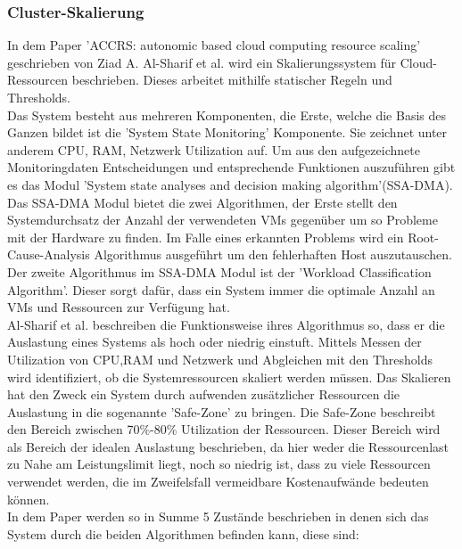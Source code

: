 \documentclass[a4paper,12pt]{scrartcl}
\begin{document}
\subsubsection{Cluster-Skalierung}

In dem Paper 'ACCRS: autonomic based cloud computing resource scaling' geschrieben von Ziad A. Al-Sharif et al. wird ein Skalierungssystem für Cloud-Ressourcen beschrieben. Dieses arbeitet mithilfe statischer Regeln und Thresholds.\\
Das System besteht aus mehreren Komponenten, die Erste, welche die Basis des Ganzen bildet ist die 'System State Monitoring' Komponente. Sie zeichnet unter anderem CPU, RAM, Netzwerk Utilization auf. Um aus den aufgezeichnete Monitoringdaten Entscheidungen und entsprechende Funktionen auszuführen gibt es das Modul 'System state analyses and decision making algorithm'(SSA-DMA). Das SSA-DMA Modul bietet die zwei Algorithmen, der Erste stellt den Systemdurchsatz der Anzahl der verwendeten VMs gegenüber um so Probleme mit der Hardware zu finden. Im Falle eines erkannten Problems wird ein Root-Cause-Analysis Algorithmus ausgeführt um den fehlerhaften Host auszutauschen.\\
Der zweite Algorithmus im SSA-DMA Modul ist der 'Workload Classification Algorithm'.
Dieser sorgt dafür, dass ein System immer die optimale Anzahl an VMs und Ressourcen zur Verfügung hat.\\
Al-Sharif et al. beschreiben die Funktionsweise ihres Algorithmus so, dass er die Auslastung eines Systems als hoch oder niedrig einstuft. Mittels Messen der Utilization von CPU,RAM und Netzwerk und Abgleichen mit den Thresholds wird identifiziert, ob die Systemressourcen skaliert werden müssen. Das Skalieren hat den Zweck ein System durch aufwenden zusätzlicher Ressourcen die Auslastung in die sogenannte 'Safe-Zone' zu bringen. Die Safe-Zone beschreibt den Bereich zwischen 70\%-80\% Utilization der Ressourcen. Dieser Bereich wird als Bereich der idealen Auslastung beschrieben, da hier weder die Ressourcenlast zu Nahe am Leistungslimit liegt, noch so niedrig ist, dass zu viele Ressourcen verwendet werden, die im Zweifelsfall vermeidbare Kostenaufwände bedeuten können.\\
In dem Paper werden so in Summe 5 Zustände beschrieben in denen sich das System durch die beiden Algorithmen befinden kann, diese sind:
\end{document}
